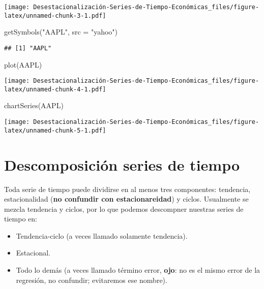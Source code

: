 \documentclass[
]{article}
\newenvironment{Shaded}{\begin{snugshade}}{\end{snugshade}}
\newcommand{\AttributeTok}[1]{\textcolor[rgb]{0.77,0.63,0.00}{#1}}
\newcommand{\FunctionTok}[1]{\textcolor[rgb]{0.00,0.00,0.00}{#1}}
\newcommand{\NormalTok}[1]{#1}
\newcommand{\StringTok}[1]{\textcolor[rgb]{0.31,0.60,0.02}{#1}}
\providecommand{\tightlist}{%
  \setlength{\itemsep}{0pt}\setlength{\parskip}{0pt}}
\begin{document}
\texttt{[image: Desestacionalización-Series-de-Tiempo-Económicas\_files/figure-latex/unnamed-chunk-3-1.pdf]}

\begin{Shaded}
\begin{Highlighting}[]
\FunctionTok{getSymbols}\NormalTok{(}\StringTok{"AAPL"}\NormalTok{, }\AttributeTok{src =} \StringTok{"yahoo"}\NormalTok{)}
\end{Highlighting}
\end{Shaded}

\begin{verbatim}
## [1] "AAPL"
\end{verbatim}

\begin{Shaded}
\begin{Highlighting}[]
\FunctionTok{plot}\NormalTok{(AAPL)}
\end{Highlighting}
\end{Shaded}

\texttt{[image: Desestacionalización-Series-de-Tiempo-Económicas\_files/figure-latex/unnamed-chunk-4-1.pdf]}

\begin{Shaded}
\begin{Highlighting}[]
\FunctionTok{chartSeries}\NormalTok{(AAPL)}
\end{Highlighting}
\end{Shaded}

\texttt{[image: Desestacionalización-Series-de-Tiempo-Económicas\_files/figure-latex/unnamed-chunk-5-1.pdf]}

\hypertarget{descomposiciuxf3n-series-de-tiempo}{%
\section{Descomposición series de
tiempo}\label{descomposiciuxf3n-series-de-tiempo}}

Toda serie de tiempo puede dividirse en al menos tres componentes:
tendencia, estacionalidad (\textbf{no confundir con estacionareidad}) y
ciclos. Usualmente se mezcla tendencia y ciclos, por lo que podemos
descompner nuestras series de tiempo en:

\begin{itemize}
\tightlist
\item
  Tendencia-ciclo (a veces llamado solamente tendencia).
\item
  Estacional.
\item
  Todo lo demás (a veces llamado término error, \textbf{ojo}: no es el
  mismo error de la regresión, no confundir; evitaremos ese nombre).
\end{itemize}
\end{document}
